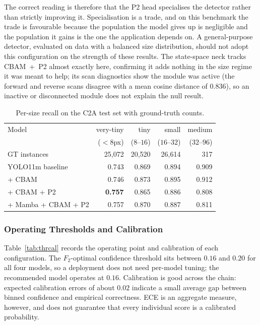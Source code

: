 The correct reading is therefore that the P2 head specialises the detector
rather than strictly improving it. Specialisation is a trade, and on this
benchmark the trade is favourable because the population the model gives up is
negligible and the population it gains is the one the application depends on. A
general-purpose detector, evaluated on data with a balanced size distribution,
should not adopt this configuration on the strength of these results. The state-space neck tracks CBAM~+~P2 almost exactly
here, confirming it adds nothing in the size regime it was meant to help; its
scan diagnostics show the module was active (the forward and reverse scans
disagree with a mean cosine distance of $0.836$), so an inactive or disconnected
module does not explain the null result.

\begin{table}[tbp]
  \centering
  \caption{Per-size recall on the C2A test set with ground-truth counts.}
  \label{tab:persize}
  \begin{tabular}{@{}l r r r r@{}}
    \toprule
    Model & very-tiny & tiny & small & medium \\
    & ($<8$px) & ($8$--$16$) & ($16$--$32$) & ($32$--$96$) \\
    GT instances & 25{,}072 & 20{,}520 & 26{,}614 & 317 \\
    \midrule
    YOLO11m baseline    & 0.743 & 0.869 & 0.894 & 0.909 \\
    + CBAM              & 0.746 & 0.873 & 0.895 & 0.912 \\
    + CBAM + P2         & \textbf{0.757} & 0.865 & 0.886 & 0.808 \\
    + Mamba + CBAM + P2 & 0.757 & 0.870 & 0.887 & 0.811 \\
    \bottomrule
  \end{tabular}
\end{table}

\subsubsection{Operating Thresholds and Calibration}
Table~\ref{tab:thrcal} records the operating point and calibration of each
configuration. The $F_2$-optimal confidence threshold sits between $0.16$ and
$0.20$ for all four models, so a deployment does not need per-model tuning;
the recommended model operates at $0.16$. Calibration is good across the
chain: expected calibration errors of about $0.02$ indicate a small average
gap between binned confidence and empirical correctness. ECE is an aggregate
measure, however, and does not guarantee that every individual score is a
calibrated probability.


